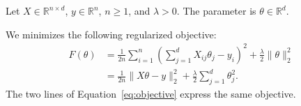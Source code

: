 Let $X\in\mathbb{R}^{n\times d}$, $y\in\mathbb{R}^{n}$,
$n\geq 1$, and $\lambda>0$. The parameter is $\theta\in\mathbb{R}^d$.

We minimizes the following regularized objective:
\begin{align}
F(\theta)
 &= \frac{1}{2n}\sum_{i=1}^{n}
    \left(\sum_{j=1}^{d}X_{ij}\theta_j-y_i\right)^2
    +\frac{\lambda}{2}\|\theta\|_2^2 \label{eq:objective}\\
 &= \frac{1}{2n}\|X\theta-y\|_2^2
    +\frac{\lambda}{2}\sum_{j=1}^{d}\theta_j^2. \nonumber
\end{align}
The two lines of Equation~\eqref{eq:objective} express the same objective.
